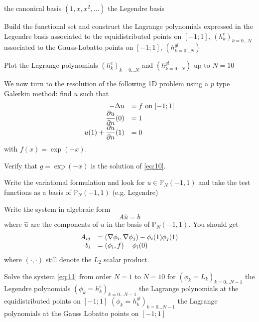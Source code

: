 \documentclass{article}
\begin{document}
\begin{Exercise}[title={p type Galerkin method in 1D}]
  \subQuestion the canonical basis $(1, x, x^2, ...)$
  \subQuestion the Legendre basis

  \Question Build the functional set and construct the Lagrange polynomials expressed in the Legendre basis
  \subQuestion associated to the equidistributed points on $[-1;1]$, $(h^e_k)_{k=0...N}$
  \subQuestion associated to the Gauss-Lobatto points on $[-1;1]$, $(h^{gl}_{k=0...N})$



  \Question Plot the Lagrange polynomials $(h^e_k)_{k=0...N}$ and $(h^{gl}_{k=0...N})$ up to $N=10$

  \ExePart
  We now turn to the resolution of the following 1D problem using a $p$ type Galerkin method: find $u$ such that
  \begin{equation}
    \label{eq:10}
    \begin{array}[c]{rl}
      -\Delta u &= f \text{ on } [-1;1]\\
      \displaystyle \frac{\partial u}{\partial n}(0) &= 1\\
      \displaystyle u(1) + \frac{\partial u}{\partial n}(1) &= 0\\
    \end{array}
  \end{equation}
  with $f(x)=\exp(-x)$.

  \Question Verify that $g=\exp(-x)$ is the solution  of \eqref{eq:10}.

  \Question Write the variational formulation and look for $u \in
  \mathbb{P}_N(-1,1)$ and take the test functions as a basis of
  $\mathbb{P}_N(-1,1)$ (e.g. Legendre)

  \Question Write the system in algebraic form
  \begin{equation}
    \label{eq:11}
    A \hat{u} = b
  \end{equation}
  where $\hat{u}$ are the components of $u$ in the basis of
  $\mathbb{P}_N(-1,1)$.
  You should get
  \begin{equation}
    \label{eq:12}
    \begin{array}[c]{rl}
      A_{ij} &= (\nabla \phi_i, \nabla \phi_j) - \phi_i(1)\phi_j(1)\\
      b_i &= (\phi_i,f) - \phi_i(0)
    \end{array}
  \end{equation}
  where $(\cdot,\cdot)$ still denote the $L_2$ scalar product.

  \Question Solve the system \eqref{eq:11} from order $N=1$ to $N=10$ for
  \subQuestion $(\phi_k = L_k)_{k=0...N-1}$ the Legendre polynomials
  \subQuestion $(\phi_k = h^{e}_k)_{k=0...N-1}$ the Lagrange polynomials at the equidistributed points on $[-1;1]$
  \subQuestion $(\phi_k = h^{gl}_k)_{k=0...N-1}$ the Lagrange polynomials at the Gauss Lobatto points on $[-1;1]$


\end{Exercise}
\end{document}
